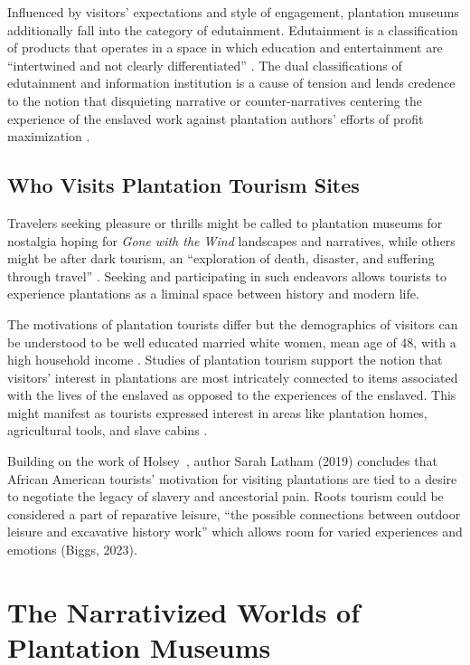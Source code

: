 \documentclass[final]{anthology-ch} %
\begin{document}
Influenced by visitors' expectations and style of engagement, plantation museums additionally fall into the category of edutainment. Edutainment is a classification of products that operates in a space in which education and entertainment are \enquote{intertwined and not clearly differentiated} \cite{bright2018tourist}. The dual classifications of edutainment and information institution is a cause of tension and lends credence to the notion that disquieting narrative or counter-narratives centering the experience of the enslaved work against plantation authors' efforts of profit maximization \cite{bright2018tourist}.

\subsection{Who Visits Plantation Tourism Sites}

Travelers seeking pleasure or thrills might be called to plantation museums for nostalgia hoping for \textit{Gone with the Wind} landscapes and narratives, while others might be after dark tourism, an \enquote{exploration of death, disaster, and suffering through travel} \cite{miles2015tales}. Seeking and participating in such endeavors allows tourists to experience plantations as a liminal space between history and modern life.

The motivations of plantation tourists differ but the demographics of visitors can be understood to be well educated married white women, mean age of 48, with a high household income \cite{bright2016who}. Studies of plantation tourism support the notion that visitors' interest in plantations are most intricately connected to items associated with the lives of the enslaved as opposed to the experiences of the enslaved. This might manifest as tourists expressed interest in areas like plantation homes, agricultural tools, and slave cabins \cite{bright2016who}.

Building on the work of Holsey~\cite{holsey2004transatlantic}, author Sarah Latham (2019) concludes that African American tourists' motivation for visiting plantations are tied to a desire to negotiate the legacy of slavery and ancestorial pain. Roots tourism could be considered a part of reparative leisure, \enquote{the possible connections between outdoor leisure and excavative history work} which allows room for varied experiences and emotions (Biggs, 2023).

\section{The Narrativized Worlds of Plantation Museums}
\end{document}
